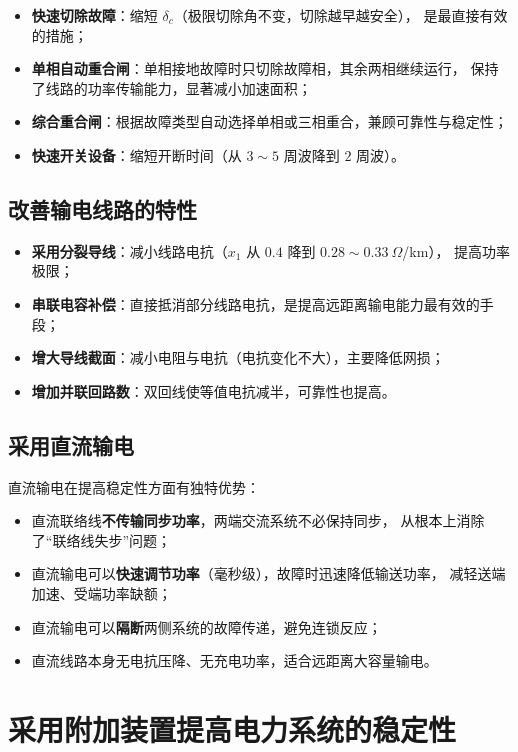 \begin{itemize}
  \item \textbf{快速切除故障}：缩短 $\delta_c$（极限切除角不变，切除越早越安全），
        是最直接有效的措施；
  \item \textbf{单相自动重合闸}：单相接地故障时只切除故障相，其余两相继续运行，
        保持了线路的功率传输能力，显著减小加速面积；
  \item \textbf{综合重合闸}：根据故障类型自动选择单相或三相重合，兼顾可靠性与稳定性；
  \item \textbf{快速开关设备}：缩短开断时间（从 $3\sim5$ 周波降到 $2$ 周波）。
\end{itemize}

\subsection{改善输电线路的特性}

\begin{itemize}
  \item \textbf{采用分裂导线}：减小线路电抗（$x_1$ 从 $0.4$ 降到 $0.28\sim0.33\ \Omega$/km），
        提高功率极限；
  \item \textbf{串联电容补偿}：直接抵消部分线路电抗，是提高远距离输电能力最有效的手段；
  \item \textbf{增大导线截面}：减小电阻与电抗（电抗变化不大），主要降低网损；
  \item \textbf{增加并联回路数}：双回线使等值电抗减半，可靠性也提高。
\end{itemize}

\subsection{采用直流输电}

直流输电在提高稳定性方面有独特优势：
\begin{itemize}
  \item 直流联络线\textbf{不传输同步功率}，两端交流系统不必保持同步，
        从根本上消除了“联络线失步”问题；
  \item 直流输电可以\textbf{快速调节功率}（毫秒级），故障时迅速降低输送功率，
        减轻送端加速、受端功率缺额；
  \item 直流输电可以\textbf{隔断}两侧系统的故障传递，避免连锁反应；
  \item 直流线路本身无电抗压降、无充电功率，适合远距离大容量输电。
\end{itemize}

\section{采用附加装置提高电力系统的稳定性}

